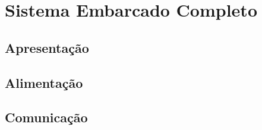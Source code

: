 \documentclass[../delivery_hospital_report.tex]{subfiles}
\begin{document}
\chapter{Sistema Embarcado Completo}
\section{Apresentação}
\section{Alimentação}
\section{Comunicação}
\end{document}
